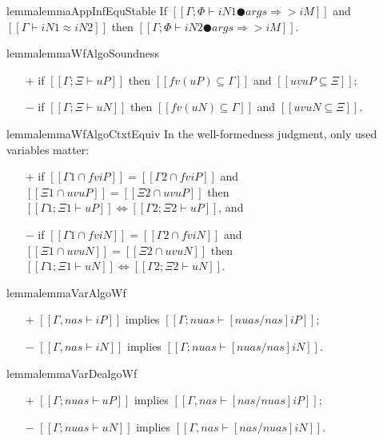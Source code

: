 \begin{restatable}{lemma}{lemmaAppInfEquStable}
    \label{lemma:app-inf-equ-stable}
    If $[[Γ; Φ ⊢ iN1 ● args ⇒> iM]]$ and $[[Γ ⊢ iN1 ≈ iN2]]$ 
    then $[[Γ; Φ ⊢ iN2 ● args ⇒> iM]]$.
\end{restatable}

\begin{restatable}{lemma}{lemmaWfAlgoSoundness}
        \label{lemma:wf-algo-soundness}
        \hfill
    \begin{itemize}
        \item[$+$] if $[[Γ ; Ξ ⊢ uP]]$ then $[[fv(uP) ⊆ Γ]]$ and $[[uv uP ⊆ Ξ]]$;
        \item[$-$] if $[[Γ ; Ξ ⊢ uN]]$ then $[[fv(uN) ⊆ Γ]]$ and $[[uv uN ⊆ Ξ]]$.
    \end{itemize}
\end{restatable}

\begin{restatable}{lemma}{lemmaWfAlgoCtxtEquiv}
    \label{lemma:wf-algo-ctxt-equiv}
    In the well-formedness judgment, only used variables matter:
    \begin{itemize}
    \item[$+$] if $[[Γ1 ∩ fv iP]] = [[Γ2 ∩ fv iP]]$
        and $[[Ξ1 ∩ uv uP]] = [[Ξ2 ∩ uv uP]]$ then
        $[[Γ1 ; Ξ1 ⊢ uP]] \iff [[Γ2 ; Ξ2 ⊢ uP]]$, and
    \item[$-$] if $[[Γ1 ∩ fv iN]] = [[Γ2 ∩ fv iN]]$
        and $[[Ξ1 ∩ uv uN]] = [[Ξ2 ∩ uv uN]]$ then
        $[[Γ1 ; Ξ1 ⊢ uN]] \iff [[Γ2 ; Ξ2 ⊢ uN]]$.
    \end{itemize}
\end{restatable}

\begin{restatable}{lemma}{lemmaVarAlgoWf}
    \label{lemma:var-algo-wf}
    \hfill
    \begin{itemize}
        \item[$+$]  $[[Γ, nas ⊢ iP]]$ implies $[[Γ; {nuas} ⊢ [nuas/nas]iP]]$;
        \item[$-$]  $[[Γ, nas ⊢ iN]]$ implies $[[Γ; {nuas} ⊢ [nuas/nas]iN]]$.
    \end{itemize}
\end{restatable}

\begin{restatable}{lemma}{lemmaVarDealgoWf}
    \label{lemma:var-dealgo-wf}
    \hfill
    \begin{itemize}
        \item[$+$]  $[[Γ; {nuas} ⊢ uP]]$ implies $[[Γ, nas ⊢ [nas/nuas]iP]]$;
        \item[$-$]  $[[Γ; {nuas} ⊢ uN]]$ implies $[[Γ, nas ⊢ [nas/nuas]iN]]$.
    \end{itemize}
\end{restatable}

